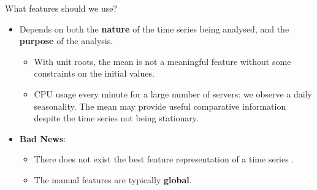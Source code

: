 \documentclass[10pt,aspectratio=43]{beamer}
\begin{document}
\begin{frame}{What features should we use?}
    \begin{itemize}

  \item
    Depends on both the \textbf{nature} of the time series being analysed,
    and the \textbf{purpose} of the analysis.
    \begin{itemize}

    \item
      With unit roots, the mean is not a meaningful feature without some
      constraints on the initial values.
    \item
      CPU usage every minute for a large number of servers: we observe a
      daily seasonality. The mean may provide useful comparative
      information despite the time series not being stationary.
    \end{itemize}
  \item \textbf{Bad News}:
  \begin{itemize}

    \item There does not exist the best feature representation of a time series
      \citep{fulcher2018feature}.

    \item The manual features are typically \textbf{ global}.
    \end{itemize}

  \end{itemize}

\end{frame}
\end{document}
